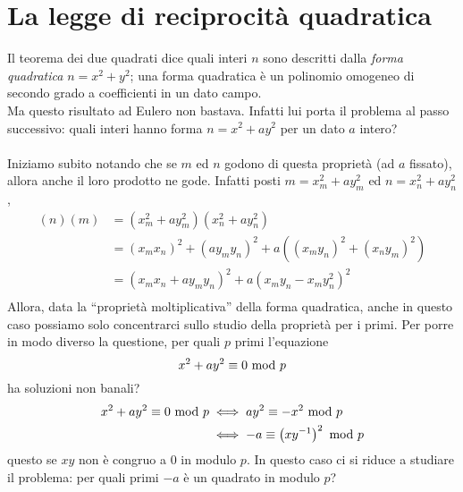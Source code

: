 \section{La legge di reciprocità quadratica}
\label{lezione12}
Il teorema dei due quadrati dice quali interi $n$ sono descritti dalla \textit{forma quadratica} $n=x^2+y^2$; una forma quadratica è un polinomio omogeneo di secondo grado a coefficienti in un dato campo. \\ Ma questo risultato ad Eulero non bastava. Infatti lui porta il problema al passo successivo: quali interi hanno forma $n=x^2+ay^2$ per un dato $a$ intero? \\ \\
Iniziamo subito notando che se $m$ ed $n$ godono di questa proprietà (ad $a$ fissato), allora anche il loro prodotto ne gode. Infatti posti $m=x_m^2+ay_m^2$ ed $n=x_n^2+ay_n^2$,
\begin{align*}
(n)(m)
&=\left(x_m^2+ay_m^2\right)\left(x_n^2+ay_n^2\right)\\
&=\left(x_mx_n\right)^2+\left(ay_my_n\right)^2+a\left(\left(x_my_n\right)^2+\left(x_ny_m\right)^2\right)\\
&=\left(x_mx_n+ay_my_n\right)^2+a\left(x_my_n-x_my_n^2\right)^2\\
\end{align*}
Allora, data la \enquote{proprietà moltiplicativa} della forma quadratica, anche in questo caso possiamo solo concentrarci sullo studio della proprietà per i primi. Per porre in modo diverso la questione, per quali $p$ primi l'equazione 
\begin{equation*}
x^2+ay^2\equiv0\ \mathrm{mod}\ p
\end{equation*}
ha soluzioni non banali? 
\begin{align*}
x^2+ay^2\equiv0\ \mathrm{mod}\ p
&\iff ay^2\equiv -x^2\ \mathrm{mod}\ p\\
&\iff -a\equiv \left(xy^{-1}\right)^2\ \mathrm{mod}\ p
\end{align*}
questo se $xy$ %
non è congruo a 0 in modulo $p$. In questo caso ci si riduce a studiare il problema: per quali primi $-a$ è un quadrato in modulo $p$?
